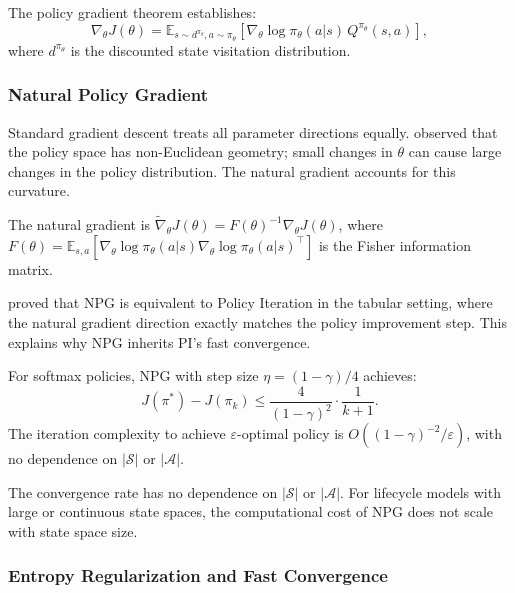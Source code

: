 The policy gradient theorem \citep{SuttonMcAllester2000} establishes:
\begin{equation}
\nabla_\theta J(\theta) = \mathbb{E}_{s \sim d^{\pi_\theta}, a \sim \pi_\theta} \left[ \nabla_\theta \log \pi_\theta(a|s) \, Q^{\pi_\theta}(s,a) \right],
\end{equation}
where $d^{\pi_\theta}$ is the discounted state visitation distribution.


\subsubsection{Natural Policy Gradient}

Standard gradient descent treats all parameter directions equally. \citet{Kakade2001} observed that the policy space has non-Euclidean geometry; small changes in $\theta$ can cause large changes in the policy distribution. The natural gradient accounts for this curvature.

\begin{definition}
The natural gradient is $\tilde{\nabla}_\theta J(\theta) = F(\theta)^{-1} \nabla_\theta J(\theta)$, where $F(\theta) = \mathbb{E}_{s,a}[\nabla_\theta \log \pi_\theta(a|s) \nabla_\theta \log \pi_\theta(a|s)^\top]$ is the Fisher information matrix.
\end{definition}

\citet{Kakade2001} proved that NPG is equivalent to Policy Iteration in the tabular setting, where the natural gradient direction exactly matches the policy improvement step. This explains why NPG inherits PI's fast convergence.

\begin{theorem}
\label{thm:npg_convergence}
For softmax policies, NPG with step size $\eta = (1-\gamma)/4$ achieves:
\begin{equation}
J(\pi^*) - J(\pi_k) \leq \frac{4}{(1-\gamma)^2} \cdot \frac{1}{k+1}.
\end{equation}
The iteration complexity to achieve $\varepsilon$-optimal policy is $O((1-\gamma)^{-2}/\varepsilon)$, with no dependence on $|\mathcal{S}|$ or $|\mathcal{A}|$.
\end{theorem}

The convergence rate has no dependence on $|\mathcal{S}|$ or $|\mathcal{A}|$. For lifecycle models with large or continuous state spaces, the computational cost of NPG does not scale with state space size.


\subsubsection{Entropy Regularization and Fast Convergence}

